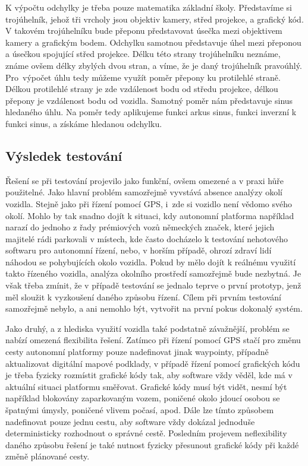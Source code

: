 \documentclass[czech, bachelor]{diploma}
\begin{document}
K výpočtu odchylky je třeba pouze matematika základní školy. Představíme si trojúhelník, jehož tři vrcholy jsou objektiv kamery,
střed projekce, a grafický kód. V takovém trojúhelníku bude přeponu představovat úsečka mezi objektivem kamery a grafickým bodem.
Odchylku samotnou představuje úhel mezi přeponou a úsečkou spojující střed projekce. Délku této strany trojúhelníku neznáme, známe
ovšem délky zbylých dvou stran, a víme, že je daný trojúhelník pravoúhlý. Pro~výpočet úhlu tedy můžeme využít poměr přepony ku
protilehlé straně. Délkou protilehlé strany je zde vzdálenost bodu od středu projekce, délkou přepony je vzdálenost bodu
od vozidla. Samotný poměr nám představuje sinus hledaného úhlu. Na poměr tedy aplikujeme funkci arkus sinus, funkci inverzní k
funkci sinus, a získáme hledanou odchylku.

\subsection{Výsledek testování}

Řešení se při testování projevilo jako funkční, ovšem omezené a v praxi hůře použitelné. Jako hlavní problém samozřejmě vyvstává
absence analýzy okolí vozidla. Stejně jako při řízení pomocí GPS, i~zde si vozidlo není vědomo svého okolí. Mohlo by tak snadno
dojít k situaci, kdy autonomní platforma například narazí do jednoho z řady prémiových vozů německých značek, které jejich
majitelé rádi parkovali v místech, kde často docházelo k testování nehotového softwaru pro autonomní řízení, nebo, v horším
případě, ohrozí zdraví lidí náhodou se pohybujících okolo vozidla. Pokud by mělo dojít k reálnému využití takto řízeného vozidla,
analýza okolního prostředí samozřejmě bude nezbytná. Je však třeba zmínit, že v případě testování se jednalo teprve o první
prototyp, jenž měl sloužit k vyzkoušení daného způsobu řízení. Cílem při prvním testování samozřejmě nebylo, a ani nemohlo být,
vytvořit na první pokus dokonalý systém.

Jako druhý, a z hlediska využití vozidla také podstatně závažnější, problém se nabízí omezená flexibilita řešení. Zatímco při
řízení pomocí GPS stačí pro změnu cesty autonomní platformy pouze nadefinovat jinak waypointy, případně aktualizovat digitální
mapové podklady, v případě řízení pomocí grafických kódu je třeba fyzicky rozmístit grafické kódy tak, aby software vždy věděl,
kde má v aktuální situaci platformu směřovat. Grafické kódy musí být vidět, nesmí být například blokovány zaparkovaným vozem,
poničené okolo jdoucí osobou se špatnými úmysly, poničené vlivem počasí, apod. Dále lze tímto způsobem nadefinovat pouze jednu
cestu, aby software vždy dokázal jednoduše deterministicky rozhodnout o správné cestě. Posledním projevem neflexibility daného
způsobu řešení je také nutnost fyzicky přesunout grafické kódy při každé změně plánované cesty.
\end{document}
